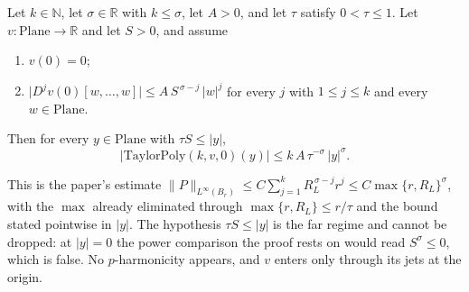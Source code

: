 \begin{lemma}
Let $k\in\mathbb{N}$, let $\sigma\in\mathbb{R}$ with $k\le\sigma$, let $A>0$, and let $\tau$
satisfy $0<\tau\le1$.  Let $v\colon\mathrm{Plane}\to\mathbb{R}$ and let $S>0$, and assume
\begin{enumerate}
\item[(H1)] $v(0)=0$;
\item[(H2)] $\bigl\lvert D^{j}v(0)[w,\ldots,w]\bigr\rvert\le A\,S^{\,\sigma-j}\,\lvert w\rvert^{j}$
  for every $j$ with $1\le j\le k$ and every $w\in\mathrm{Plane}$.
\end{enumerate}
Then for every $y\in\mathrm{Plane}$ with $\tau S\le\lvert y\rvert$,
\[
  \bigl\lvert\mathrm{TaylorPoly}(k,v,0)(y)\bigr\rvert
  \le k\,A\,\tau^{-\sigma}\,\lvert y\rvert^{\sigma}.
\]

This is the paper's estimate
$\lVert P\rVert_{L^{\infty}(B_r)}\le C\sum_{j=1}^{k}R_L^{\,\sigma-j}r^{j}\le
C\max\{r,R_L\}^{\sigma}$, with the $\max$ already eliminated through
$\max\{r,R_L\}\le r/\tau$ and the bound stated pointwise in $\lvert y\rvert$.  The hypothesis
$\tau S\le\lvert y\rvert$ is the far regime and cannot be dropped: at $\lvert y\rvert=0$ the
power comparison the proof rests on would read $S^{\sigma}\le0$, which is false.  No
$p$-harmonicity appears, and $v$ enters only through its jets at the origin.
\end{lemma}
